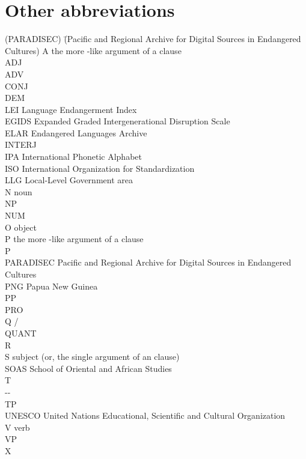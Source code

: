 \section*{Other abbreviations}
\begin{tabbing}
{(PARADISEC)}  \= {(Pacific and Regional Archive for Digital Sources in Endangered Cultures)}\kill
A   \>   the more -like argument of a  clause\\
ADJ  \>  \\
ADV  \>  \\
CONJ  \>  \\
DEM  \>  \\
LEI  \>  Language Endangerment Index\\
EGIDS  \>  Expanded Graded Intergenerational Disruption Scale\\
ELAR  \>  Endangered Languages Archive\\
INTERJ \> \\
IPA  \>  International Phonetic Alphabet\\
ISO  \>  International Organization for Standardization\\
LLG  \>  Local-Level Government area\\
N  \>    noun\\
NP  \>    \\
NUM \>   \\
O   \>   object\\
P  \>    the more -like argument of a  clause\\
P   \>   \\
PARADISEC  \> Pacific and Regional Archive for Digital Sources in Endangered\\
 \> Cultures\\
PNG  \>  Papua New Guinea\\
PP   \>   \\
PRO  \>  \\
Q   \>    / \\
QUANT \> \\
R  \>    \\
S   \>   subject (or, the single argument of an  clause)\\
SOAS \>   School of Oriental and African Studies\\
T   \>   \\
  \>  --\\
TP   \>   \\
UNESCO \> United Nations Educational, Scientific and Cultural Organization\\
V   \>   verb\\
VP  \>    \\
X  \>    
\end{tabbing}

